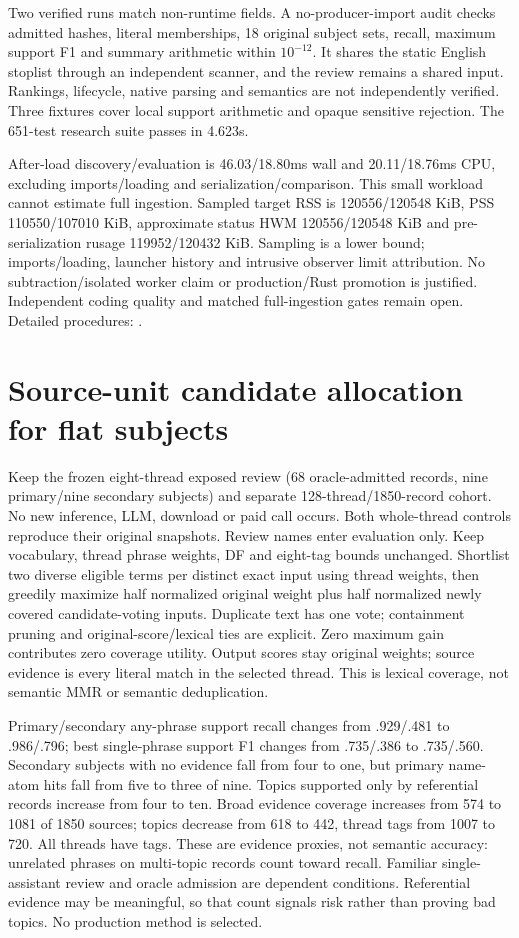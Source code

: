 \documentclass[11pt]{article}
\begin{document}
Two verified runs match non-runtime fields. A no-producer-import audit checks
admitted hashes, literal memberships, 18 original subject sets, recall, maximum
support F1 and summary arithmetic within $10^{-12}$. It shares the static
English stoplist through an independent scanner, and the review remains a
shared input. Rankings, lifecycle, native parsing and semantics are not
independently verified. Three fixtures cover local support arithmetic and opaque
sensitive rejection. The 651-test research suite passes in 4.623s.

After-load discovery/evaluation is 46.03/18.80ms wall and 20.11/18.76ms CPU,
excluding imports/loading and serialization/comparison. This small workload
cannot estimate full ingestion. Sampled target RSS is 120556/120548 KiB,
PSS 110550/107010 KiB, approximate status HWM 120556/120548 KiB and
pre-serialization rusage 119952/120432 KiB. Sampling is a lower bound;
imports/loading, launcher history and intrusive observer limit attribution.
No subtraction/isolated worker claim or production/Rust promotion is justified.
Independent coding quality and matched full-ingestion gates remain open.
Detailed procedures: .

\section{Source-unit candidate allocation for flat subjects}
Keep the frozen eight-thread exposed review (68 oracle-admitted records,
nine primary/nine secondary subjects) and separate 128-thread/1850-record
cohort. No new inference, LLM, download or paid call occurs. Both whole-thread
controls reproduce their original snapshots. Review names enter evaluation
only. Keep vocabulary, thread phrase weights, DF and eight-tag bounds unchanged.
Shortlist two diverse eligible terms per distinct exact input using thread
weights, then greedily maximize half normalized original weight plus half
normalized newly covered candidate-voting inputs. Duplicate text has one vote;
containment pruning and original-score/lexical ties are explicit. Zero maximum
gain contributes zero coverage utility. Output scores stay original weights;
source evidence is every literal match in the selected thread. This is lexical
coverage, not semantic MMR or semantic deduplication.

Primary/secondary any-phrase support recall changes from .929/.481 to
.986/.796; best single-phrase support F1 changes from .735/.386 to
.735/.560. Secondary subjects with no evidence fall from four to one, but
primary name-atom hits fall from five to three of nine. Topics supported only
by referential records increase from four to ten. Broad evidence coverage
increases from 574 to 1081 of 1850 sources; topics decrease from 618 to 442,
thread tags from 1007 to 720. All threads have tags. These are evidence proxies,
not semantic accuracy: unrelated phrases on multi-topic records count toward
recall. Familiar single-assistant review and oracle admission are dependent
conditions. Referential evidence may be meaningful, so that count signals
risk rather than proving bad topics. No production method is selected.
\end{document}
